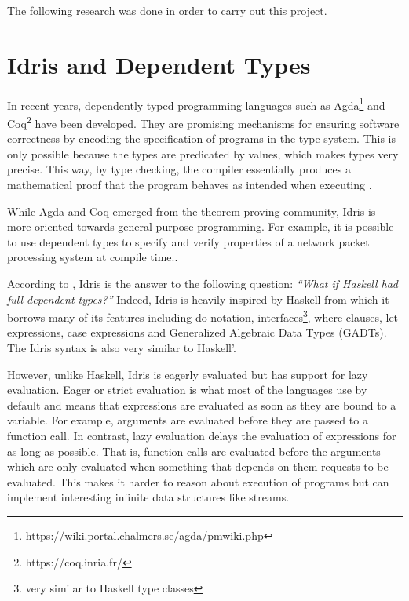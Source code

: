 The following research was done in order to carry out this
project.

\section{Idris and Dependent Types}
In recent years, dependently-typed programming languages such
as Agda\footnote{https://wiki.portal.chalmers.se/agda/pmwiki.php}
and Coq\footnote{https://coq.inria.fr/} have been developed.
They are promising mechanisms for ensuring software correctness
by encoding the specification of programs in the type system.
This is only possible because the types are predicated by values,
which makes types very precise.
This way, by type checking, the compiler essentially produces a
mathematical proof that the program behaves as intended when
executing \citep{brady_2013}.

While Agda and Coq emerged from the theorem proving community,
Idris is more oriented towards general purpose programming. For
example, it is possible to use dependent types to specify and
verify properties of a network packet processing
system at compile time.\citep{systemprog}.




According to \citep{brady_2013}, Idris is the answer to the following
question:
\emph{``What if Haskell had full dependent types?''}
Indeed, Idris is heavily inspired by Haskell from which it
borrows many of its features including do notation,
interfaces\footnote{very similar to Haskell type
    classes}, where clauses, let expressions, case expressions and
Generalized Algebraic Data Types (GADTs).
The Idris syntax is also very similar to Haskell'.

However, unlike Haskell, Idris is eagerly evaluated but has
support for lazy evaluation.
Eager or strict evaluation is what most of the languages
use by default and means that expressions are evaluated
as soon as they are bound to a variable.
For example, arguments are evaluated before they are passed
to a function call.
In contrast, lazy evaluation delays the evaluation of expressions for
as long as possible.
That is, function calls are evaluated before the arguments which
are only evaluated when something that depends on them requests to
be evaluated.
This makes it harder to reason about execution of programs but can
implement interesting infinite data structures like streams.

